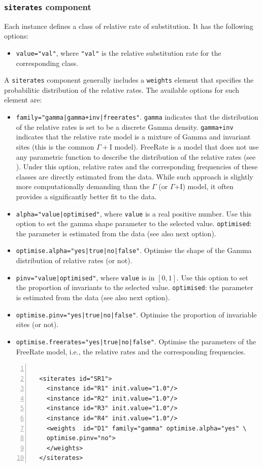 \documentclass[a4paper,12pt]{article}
\newcommand{\x}[1]{\texttt{#1}}
\begin{document}
\subsubsection{{\tt siterates} component}
Each instance defines a class of relative rate of substitution. It has the following options:
\begin{itemize}
\item \x{value="val"}, where \x{"val"} is the relative substitution rate for the corresponding class.
\end{itemize}
A \x{siterates} component generally includes a \x{weights} element that specifies the probabilitic
distribution of the relative rates. The available options for such element are:
\begin{itemize}
\item \x{family="gamma|gamma+inv|freerates"}. \x{gamma} indicates that the distribution of the
  relative rates is set to be a discrete Gamma density. \x{gamma+inv} indicates that the relative rate model
  is a mixture of Gamma and invariant sites (this is the common $\Gamma+$I model). FreeRate is
  a model that does not use any parametric function to describe the distribution of the relative
  rates (see \cite{soubrier12}). Under this option, relative rates and the corresponding frequencies of these classes are
  directly estimated from the data. While such approach is slightly more computationally demanding
  than the $\Gamma$ (or $\Gamma$+I) model, it often provides a significantly better fit to the data.
\item \x{alpha="value|optimised"}, where \x{value} is a real positive number. Use this option to set
   the gamma shape parameter to the selected value. \x{optimised}: the parameter is estimated from
   the data (see also next option).
\item \x{optimise.alpha="yes|true|no|false"}. Optimise the shape of the Gamma distribution of
  relative rates (or not).
\item \x{pinv="value|optimised"}, where \x{value} is in $[0,1]$. Use this option to set
   the proportion of invariants to the selected value. \x{optimised}: the parameter is estimated from
   the data (see also next option).
\item \x{optimise.pinv="yes|true|no|false"}. Optimise the proportion of invariable sites (or not).
\item \x{optimise.freerates="yes|true|no|false"}. Optimise the parameters of the FreeRate model,
  i.e., the relative rates and the corresponding frequencies.
\end{itemize}
\vspace{0.2cm}
\begin{Verbatim}[frame=single, label=Example of `siterates' component (discrete gamma model), samepage=true,
  baselinestretch=0.5, fontsize=\small, numbers=left]

  <siterates id="SR1">
    <instance id="R1" init.value="1.0"/>
    <instance id="R2" init.value="1.0"/>
    <instance id="R3" init.value="1.0"/>
    <instance id="R4" init.value="1.0"/>
    <weights  id="D1" family="gamma" optimise.alpha="yes" \
    optimise.pinv="no">
    </weights>
  </siterates>
\end{Verbatim}
\end{document}
